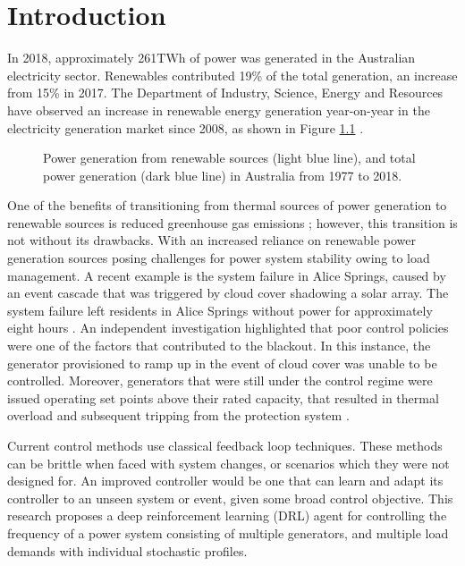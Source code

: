 \chapter{Introduction}
In 2018, approximately 261$\si{\tera\watt\hour}$ of power was generated in the Australian electricity sector. Renewables contributed 19\% of the total generation, an increase from 15\% in 2017. The Department of Industry, Science, Energy and Resources have observed an increase in renewable energy generation year-on-year in the electricity generation market since 2008, as shown in Figure \ref{fig:101_renewable_energy} \cite{Diser2020}.\\

\begin{figure}[ht]
	\centering
	
	\caption{Power generation from renewable sources (light blue line), and total power generation (dark blue line) in Australia from 1977 to 2018.}
	\label{fig:101_renewable_energy}
\end{figure}

One of the benefits of transitioning from thermal sources of power generation to renewable sources is reduced greenhouse gas emissions \cite{IPCC2012}; however, this transition is not without its drawbacks. With an increased reliance on renewable power generation sources posing challenges for power system stability owing to load management. A recent example is the system failure in Alice Springs, caused by an event cascade that was triggered by cloud cover shadowing a solar array. The system failure left residents in Alice Springs without power for approximately eight hours \cite{UCNT2019}. An independent investigation highlighted that poor control policies were one of the factors that contributed to the blackout. In this instance, the generator provisioned to ramp up in the event of cloud cover was unable to be controlled. Moreover, generators that were still under the control regime were issued operating set points above their rated capacity, that resulted in thermal overload and subsequent tripping from the protection system \cite{Wilkey2019}.

Current control methods use classical feedback loop techniques. These methods can be brittle when faced with system changes, or scenarios which they were not designed for. An improved controller would be one that can learn and adapt its controller to an unseen system or event, given some broad control objective. This research proposes a deep reinforcement learning (DRL) agent for controlling the frequency of a power system consisting of multiple generators, and multiple load demands with individual stochastic profiles.

